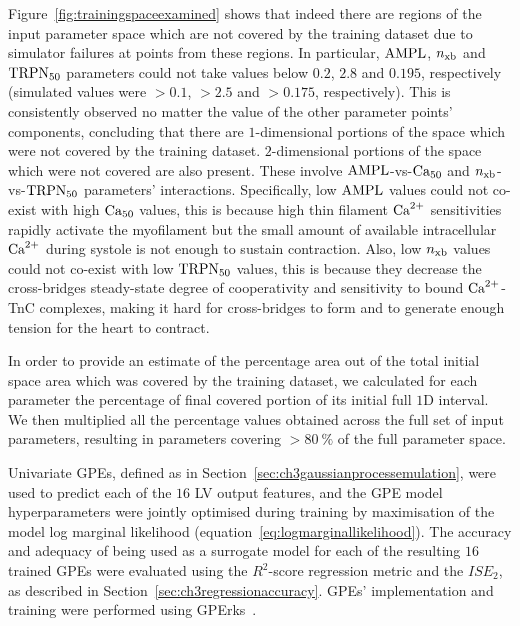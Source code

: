 \vspace{0.2cm}\noindent
Figure~\ref{fig:trainingspaceexamined} shows that indeed there are regions of the input parameter space which are not covered by the training dataset due to simulator failures at points from these regions. In particular, $\textrm{AMPL}$, $n_{\textrm{xb}}$ and $\textrm{TRPN}_{50}$ parameters could not take values below $0.2$, $2.8$ and $0.195$, respectively (simulated values were $>0.1$, $>2.5$ and $>0.175$, respectively). This is consistently observed no matter the value of the other parameter points' components, concluding that there are $1$-dimensional portions of the space which were not covered by the training dataset. $2$-dimensional portions of the space which were not covered are also present. These involve $\textrm{AMPL}$-vs-$\textrm{Ca}_{50}$ and $n_{\textrm{xb}}$-vs-$\textrm{TRPN}_{50}$ parameters' interactions. Specifically, low $\textrm{AMPL}$ values could not co-exist with high $\textrm{Ca}_{50}$ values, this is because high thin filament $\textrm{Ca}^{2+}$ sensitivities rapidly activate the myofilament but the small amount of available intracellular $\textrm{Ca}^{2+}$ during systole is not enough to sustain contraction. Also, low $n_{\textrm{xb}}$ values could not co-exist with low $\textrm{TRPN}_{50}$ values, this is because they decrease the cross-bridges steady-state degree of cooperativity and sensitivity to bound $\textrm{Ca}^{2+}$-TnC complexes, making it hard for cross-bridges to form and to generate enough tension for the heart to contract.

\vspace{0.2cm}\noindent
In order to provide an estimate of the percentage area out of the total initial space area which was covered by the training dataset, we calculated for each parameter the percentage of final covered portion of its initial full $1$D interval. We then multiplied all the percentage values obtained across the full set of input parameters, resulting in parameters covering $>\SI{80}{\percent}$ of the full parameter space.

\vspace{0.2cm}
Univariate GPEs, defined as in Section~\ref{sec:ch3gaussianprocessemulation}, were used to predict each of the $16$ LV output features, and the GPE model hyperparameters were jointly optimised during training by maximisation of the model log marginal likelihood (equation~\eqref{eq:logmarginallikelihood}). The accuracy and adequacy of being used as a surrogate model for each of the resulting $16$ trained GPEs were evaluated using the $R^2$-score regression metric and the $ISE_2$, as described in Section~\ref{sec:ch3regressionaccuracy}. GPEs' implementation and training were performed using GPErks~\cite{GPErks:2021}.

